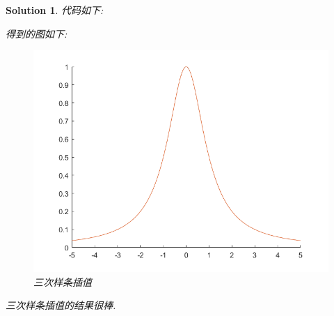 \documentclass[a4paper, 12pt]{ctexart}
\let\oldlstinputlisting
\renewcommand{}[2][\empty]{
    \par\nolinenumbers\oldlstinputlisting[#1]{#2}\linenumbers\par
}
\theoremstyle{plain}
\theoremstyle{plain}
\theoremstyle{plain}
\theoremstyle{nonumberplain}
\newtheorem{solution}{Solution}
\begin{document}
    \begin{solution}
        代码如下:
        

        得到的图如下:
        \begin{figure}[H]
            \centering
            \includegraphics[scale=0.5]{3_5.png}
            \caption{三次样条插值}
        \end{figure}
        
        三次样条插值的结果很棒.
    \end{solution}


\end{document}
